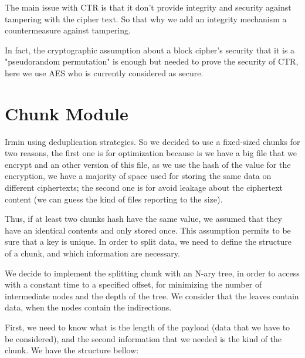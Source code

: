 \documentclass[10pt,a4paper]{report}
\begin{document}
The main issue with CTR is that it don't provide integrity and security against tampering with the cipher text. So that why we add an integrity mechanism a countermeasure against tampering.\newline

In fact, the cryptographic assumption about a block cipher's security that it is a "pseudorandom permutation" is enough but needed to prove the security of CTR, here we use AES who is currently considered as secure.\newline

 
\chapter{Chunk Module}

Irmin using deduplication strategies. So we decided to use a fixed-sized chunks for two reasons, the first one is for optimization because is we have a big file that we encrypt and an other version of this file, as we use the hash of the value for the encryption, we have a majority of space used for storing the same data on different ciphertexts; the second one is for avoid leakage about the ciphertext content (we can guess the kind of files reporting to the size). \newline
  
Thus, if at least two chunks hash have the same value, we assumed that they have an identical contents and only stored once.
This assumption permits to be sure that a key is unique. In order to split data, we need to define the structure of a chunk, and which information are necessary. \newline

We decide to implement the splitting chunk with an N-ary tree, in order to access with a constant time to a specified offset, for minimizing the number of intermediate nodes and the depth of the tree. We consider that the leaves contain data, when the nodes contain the indirections. \newline

First, we need to know what is the length of the payload (data that we have to be considered), and the second information that we needed is the kind of the chunk. We have the structure bellow:\newline
\end{document}
